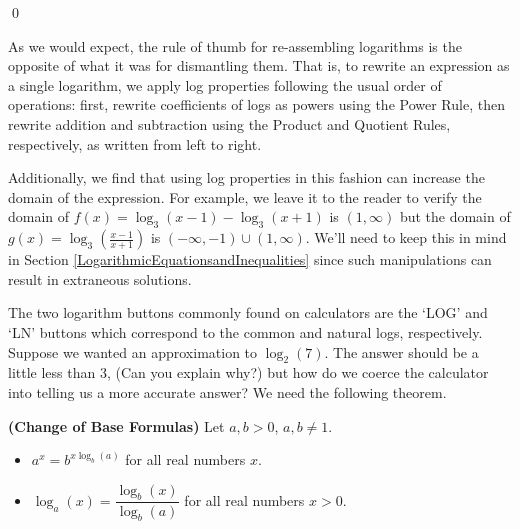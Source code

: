 \documentclass{ximera}
\begin{document}
\begin{example}
\begin{enumerate}
\end{enumerate}

\vspace{-.3in} \qed

\end{example}

As we would expect, the rule of thumb for re-assembling logarithms is the opposite of what it was for dismantling them.  That is, to rewrite an expression as a single logarithm, we apply log properties following the usual order of operations:  first,  rewrite coefficients of logs as powers using the Power Rule, then rewrite addition and subtraction using the Product and Quotient Rules, respectively, as written from left to right.

\smallskip

Additionally, we find that using log properties in this fashion can increase the domain of the expression.  For example, we leave it to the reader to verify the domain of $f(x) = \log_{3}(x-1) - \log_{3}(x+1)$ is $(1,\infty)$ but the domain of $g(x) = \log_{3}\left(\frac{x-1}{x+1}\right)$ is $(-\infty, -1) \cup (1, \infty)$.  We'll need to keep this in mind in Section \ref{LogarithmicEquationsandInequalities} since such manipulations can result in extraneous solutions.

\smallskip

The two logarithm buttons commonly found on calculators are the `LOG' and `LN' buttons which correspond to the common and natural logs, respectively.  Suppose we wanted an approximation to $\log_{2}(7)$.  The answer should be a little less than $3$, (Can you explain why?) but how do we coerce the calculator into telling us a more accurate answer?  We need the following theorem.

\smallskip


\begin{theorem} \label{changeofbase} \textbf{(Change of Base Formulas)} Let $a,b >0$, $a,b \neq 1$.   

\begin{itemize}

\item  $a^{x} = b^{x \log_{b}(a)}$ for all real numbers $x$.

\item  $\log_{a}(x) = \dfrac{\log_{b}(x)}{\log_{b}(a)}$ for all real numbers $x > 0$.

\end{itemize}

\end{theorem}
\end{document}
